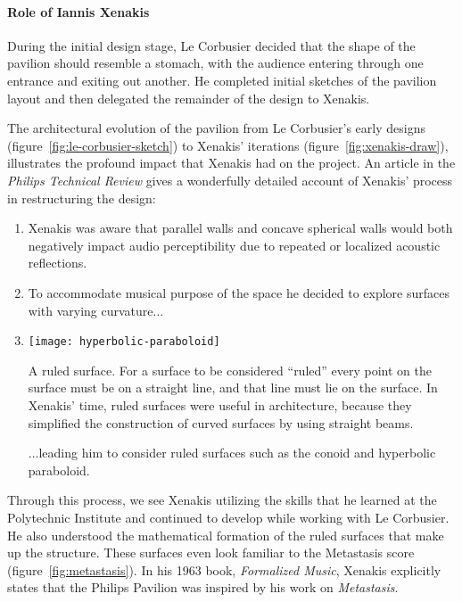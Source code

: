 \paragraph{Role of Iannis Xenakis} During the initial design stage, Le
Corbusier decided that the shape of the pavilion should resemble a
stomach, with the audience entering through one entrance and exiting
out another. He completed initial sketches of the pavilion layout and
then delegated the remainder of the design to
Xenakis.\cite{Clarke2012}

The architectural evolution of the pavilion from Le Corbusier's early
designs (figure~\ref{fig:le-corbusier-sketch}) to Xenakis' iterations
(figure~\ref{fig:xenakis-draw}), illustrates the profound impact that
Xenakis had on the project. An article in the \textit{Philips
  Technical Review}\cite{philips1958} gives a wonderfully detailed
account of Xenakis' process in restructuring the design:
\begin{enumerate}
\item Xenakis was aware that parallel walls and concave spherical
  walls would both negatively impact audio perceptibility due to repeated
  or localized acoustic reflections.
\item To accommodate musical purpose of the space he decided to
  explore surfaces with varying curvature...
\item 
  \begin{marginfigure}
    \texttt{[image: hyperbolic-paraboloid]}
    \caption{A ruled surface. For a surface to be considered ``ruled''
      every point on the surface must be on a straight line, and that
      line must lie on the surface. In Xenakis' time, ruled surfaces
      were useful in architecture, because they simplified the
      construction of curved surfaces by using straight beams.}
    \label{fig:ruled-surface}
  \end{marginfigure}...leading him to consider ruled surfaces such as
  the conoid and hyperbolic paraboloid. 
\end{enumerate}
Through this process, we see Xenakis utilizing the skills that he
learned at the Polytechnic Institute and continued to develop while
working with Le Corbusier. He also understood the mathematical
formation of the ruled surfaces that make up the structure. These
surfaces even look familiar to the Metastasis score
(figure~\ref{fig:metastasis}). In his 1963 book, \textit{Formalized
  Music}, Xenakis explicitly states that the Philips Pavilion was
inspired by his work on \textit{Metastasis}.

